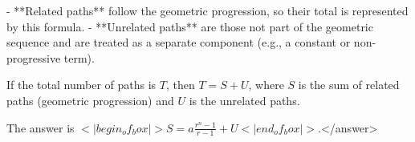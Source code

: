 - **Related paths** follow the geometric progression, so their total is represented by this formula.  
- **Unrelated paths** are those not part of the geometric sequence and are treated as a separate component (e.g., a constant or non-progressive term).  

If the total number of paths is \( T \), then \( T = S + U \), where \( S \) is the sum of related paths (geometric progression) and \( U \) is the unrelated paths.  

The answer is \(<|begin_of_box|>S = a \frac{r^n - 1}{r - 1} + U<|end_of_box|>\).</answer>